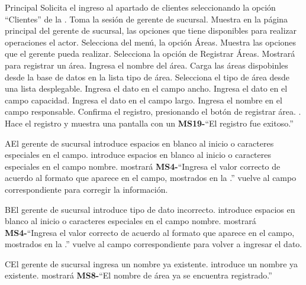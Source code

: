 	\begin{UCtrayectoria}{Principal}
		\UCpaso[\UCactor] Solicita el ingreso al apartado de clientes seleccionando la opción ``Clientes'' de la .
		\UCpaso Toma la sesión de gerente de sucursal.
		\UCpaso Muestra en la página principal del gerente de sucursal, las opciones que tiene disponibles para realizar operaciones el actor.  
		\UCpaso[\UCactor] Selecciona del menú, la opción Áreas.
		\UCpaso Muestra las opciones que el gerente pueda realizar.
		\UCpaso[\UCactor] Selecciona la opción de Registrar Áreas.  
		\UCpaso Mostrará   para registrar un área.
		\UCpaso[\UCactor] Ingresa el nombre del área.
		\UCpaso Carga las áreas dispobinles desde la base de datos en la lista tipo de área.
		\UCpaso[\UCactor] Selecciona el tipo de área desde una lista desplegable.
		\UCpaso[\UCactor] Ingresa el dato en el campo ancho.
		\UCpaso[\UCactor] Ingresa el dato en el campo capacidad.
		\UCpaso[\UCactor] Ingresa el dato en el campo largo. 
		\UCpaso[\UCactor] Ingresa el nombre en el campo responsable. 
		\UCpaso[\UCactor] Confirma el registro, presionando el botón de registrar área.  .
		\UCpaso Hace el registro y muestra una pantalla con un {\bf MS19-}``El registro fue exitoso.'' 
	\end{UCtrayectoria}
		
		\begin{UCtrayectoriaA}{A}{El gerente de sucursal introduce espacios en blanco al inicio o caracteres especiales en el campo.}
			\UCpaso[\UCactor] introduce espacios en blanco al inicio o caracteres especiales en el campo nombre.
			\UCpaso mostrará {\bf MS4-}``Ingresa el valor correcto de acuerdo al formato que aparece en el campo, mostrados en la .''
			\UCpaso[\UCactor] vuelve al campo correspondiente para corregir la información.
		\end{UCtrayectoriaA}

		\begin{UCtrayectoriaA}{B}{El gerente de sucursal introduce tipo de dato incorrecto.}
			\UCpaso[\UCactor] introduce espacios en blanco al inicio o caracteres especiales en el campo nombre.
			\UCpaso mostrará {\bf MS4-}``Ingresa el valor correcto de acuerdo al formato que aparece en el campo, mostrados en la .''
			\UCpaso[\UCactor] vuelve al campo correspondiente para volver a ingresar el dato.
		\end{UCtrayectoriaA}

		\begin{UCtrayectoriaA}{C}{El gerente de sucursal ingresa un nombre ya existente.}
			\UCpaso[\UCactor] introduce un nombre ya existente.
			\UCpaso mostrará {\bf MS8-}``El nombre de área ya se encuentra registrado.''
		\end{UCtrayectoriaA}